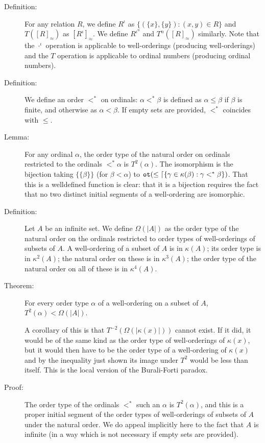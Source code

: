 \documentclass[12pt]{article}
\begin{document}
\begin{description}
\item[Definition:]  For any relation $R$, we define $R^{\iota}$ as $\{(\{x\},\{y\}):(x,y) \in R\}$ and $T([R]_\approx)$ as $[R^\iota]_\approx$.   We define $R^{\iota^n}$ and $T^n([R]_\approx)$ similarly.  Note that the $\cdot^\iota$ operation is applicable to well-orderings (producing well-orderings) and the $T$ operation is applicable to ordinal numbers (producing ordinal numbers).

\item[Definition:]  We define an order $<^*$ on ordinals:  $\alpha <^* \beta$ is defined as $\alpha\leq \beta$ if $\beta$ is finite, and otherwise as $\alpha<\beta$.  If empty sets are provided, $<^*$ coincides with $\leq$.

\item[Lemma:]  For any ordinal $\alpha$, the order type of the natural order on ordinals restricted to the ordinals $<^* \alpha$ is $T^2(\alpha)$.  The isomorphism is the bijection taking $\{\{\beta\}\}$ (for $\beta<\alpha$) to ${\tt ot}(\leq\lceil\{\gamma\in \kappa(\beta):\gamma <^* \beta\})$.  That this is a welldefined function is clear:  that it is a bijection requires the fact that no two distinct initial segments of a well-ordering are isomorphic.

\item[Definition:]  Let $A$ be an infinite set.  We define $\Omega(|A|)$ as the order type of the natural order on the ordinals restricted to order types of well-orderings of subsets of $A$.  A well-ordering of a subset of $A$ is in $\kappa(A)$;  its order type is in $\kappa^2(A)$;  the natural order on these is in $\kappa^3(A)$;  the order type of the natural order on all of these is in $\kappa^4(A)$.

\item[Theorem:]  For every order type $\alpha$ of a well-ordering on a subset of $A$, $T^2(\alpha) < \Omega(|A|)$.  

A corollary of this is that $T^{-2}(\Omega(|\kappa(x)|))$ cannot exist.  If it did, it would be of the same kind as the order type of well-orderings of $\kappa(x)$, but it would then have to be the order type of a well-ordering of $\kappa(x)$
and by the inequality just shown its image under $T^2$ would be less than itself.  This is the local version of the Burali-Forti paradox.

\item[Proof:]  The order type of the ordinals $<^*$ such an $\alpha$ is $T^2(\alpha)$, and this is a proper initial segment of the order types of well-orderings of subsets of $A$ under the natural order.  We do appeal implicitly here to the fact that $A$ is infinite (in a way which is not necessary if empty sets are provided).


\end{description}
\end{document}
